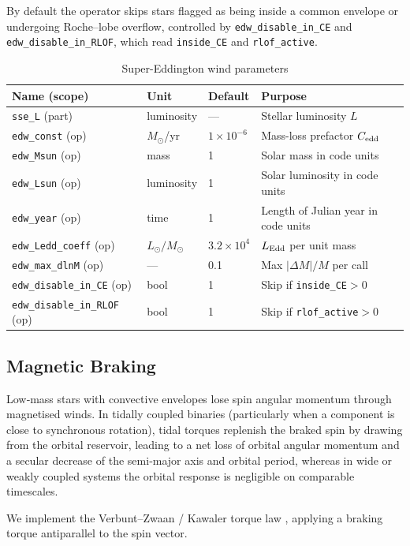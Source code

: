 \documentclass[11pt]{article}
\begin{document}
By default the operator skips stars flagged as being inside a common envelope
or undergoing Roche--lobe overflow, controlled by
\texttt{edw\_disable\_in\_CE} and \texttt{edw\_disable\_in\_RLOF}, which read
\texttt{inside\_CE} and \texttt{rlof\_active}.

\begin{table}[h]
\centering\footnotesize
\caption{Super-Eddington wind parameters}
\label{tab:edw}
\begin{tabular}{@{}llll@{}}
\toprule
Name (scope) & Unit & Default & Purpose \\
\midrule
\texttt{sse\_L} (part) & luminosity & — & Stellar luminosity $L$\\
\texttt{edw\_const} (op) & $M_\odot$/yr & $1\times10^{-6}$ & Mass-loss prefactor $C_{\rm edd}$\\
\texttt{edw\_Msun}  (op) & mass & 1 & Solar mass in code units\\
\texttt{edw\_Lsun}  (op) & luminosity & 1 & Solar luminosity in code units\\
\texttt{edw\_year}  (op) & time & 1 & Length of Julian year in code units\\
\texttt{edw\_Ledd\_coeff} (op) & $L_\odot/M_\odot$ & $3.2\times10^{4}$ & $L_{\rm Edd}$ per unit mass\\
\texttt{edw\_max\_dlnM} (op) & — & 0.1 & Max $|\Delta M|/M$ per call\\
\texttt{edw\_disable\_in\_CE} (op) & bool & 1 & Skip if \texttt{inside\_CE}$>0$\\
\texttt{edw\_disable\_in\_RLOF} (op) & bool & 1 & Skip if \texttt{rlof\_active}$>0$\\
\bottomrule
\end{tabular}
\end{table}
\subsection{Magnetic Braking}
\label{sec:mb}

Low‑mass stars with convective envelopes lose spin angular momentum through
magnetised winds. In tidally coupled binaries (particularly when a component is close to synchronous rotation), tidal torques replenish the braked spin by drawing from the orbital reservoir, leading to a net loss of orbital angular momentum and a secular decrease of the semi‑major axis and orbital period, whereas in wide or weakly coupled systems the orbital response is negligible on comparable timescales.

We implement the Verbunt--Zwaan / Kawaler torque law
\citep{Verbunt1981,Kawaler1988}, applying a braking torque antiparallel to the
spin vector.
\end{document}
